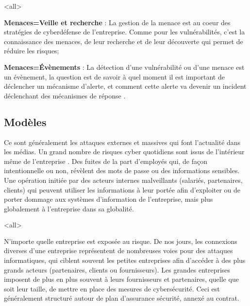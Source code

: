 \mode<all>{
{
\begin{description}
	\item \textbf{Menaces=Veille et recherche} : La gestion de la menace est au coeur des stratégies de cyberdéfense de l'entreprise. Comme pour les vulnérabilités, c'est la connaissance des menaces, de leur recherche et de leur découverte qui permet de réduire les risques;
\item  \textbf{Menaces=Évènements} : La détection d'une vulnérabilité ou d'une menace est un évènement, la question est de savoir à quel moment il est important de déclencher un mécanisme d'alerte, et comment cette alerte va devenir un incident déclenchant des mécanismes de réponse .
\end{description}
}}


\subsection{Modèles}

Ce sont généralement les attaques externes et massives qui font l’actualité dans les médias. 
Un grand nombre de risques cyber quotidiens sont issus de l'intérieur même de l'entreprise .
Des  fuites de la part d'employés qui, de façon intentionnelle ou non, révèlent des mots de passe ou des informations sensibles. Une opération initiée par des acteurs internes malveillants (salariés, partenaires, clients) qui peuvent utiliser les informations à leur portée afin d’exploiter ou de porter dommage aux systèmes d'information de l’entreprise, mais plus globalement à l'entreprise dans sa globalité.

\mode<all>{}

N’importe quelle entreprise est exposée au risque. De nos jours, les connexions diverses d’une entreprise représentent de nombreuses voies pour des attaques informatiques, qui ciblent souvent les petites entreprises afin d’accéder à des plus grands acteurs (partenaires,  clients ou fournisseurs). Les grandes entreprises imposent de plus en plus  souvent à leurs fournisseurs et partenaires, quelle que soit leur taille, de mettre en place des mesures de cybersécurité. Ceci est généralement structuré autour de plan d'assurance sécurité, annexé au contrat.

